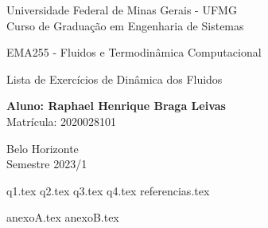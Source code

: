 \documentclass[12pt]{scrartcl}
\begin{document}

\begin{titlepage}
    \begin{center}
        \begin{Large}
            Universidade Federal de Minas Gerais - UFMG\\
            Curso de Graduação em Engenharia de Sistemas\\

            \vspace{5.0cm}


            EMA255 - Fluidos e Termodinâmica Computacional

            \vspace{5.0cm}

            Lista de Exercícios de Dinâmica dos Fluidos
            \vspace*{1cm}

            \textbf{Aluno: Raphael Henrique Braga Leivas}\\
            \vspace*{1cm}
            Matrícula: 2020028101

            \vspace{7cm}

            Belo Horizonte\\
            \vspace*{1cm}
            Semestre 2023/1
        \end{Large}
    \end{center}
\end{titlepage}

\pagestyle{fancy}

\fancyhead{}
\fancyfoot{}

{q1.tex}
{q2.tex}
{q3.tex}
{q4.tex}
{referencias.tex}

\clearpage
\onecolumn
{anexoA.tex}
{anexoB.tex}
\end{document}
